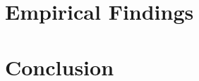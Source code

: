 \documentclass[12pt,letterpaper]{article}
\begin{document}






\section{Empirical Findings}


% 

% 

\section{Conclusion}


\clearpage 
\end{document}
